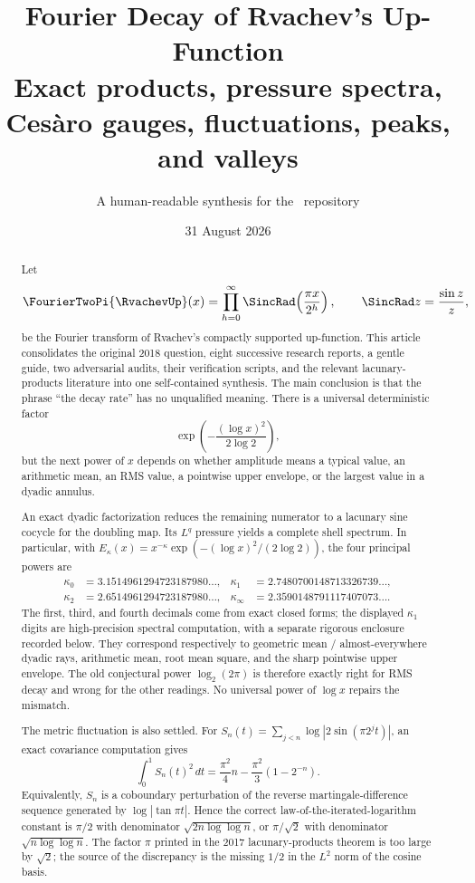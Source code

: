 \documentclass[11pt,oneside]{article}
\title{\bfseries Fourier Decay of Rvachev's Up-Function\\[0.35em]
\large Exact products, pressure spectra, Ces\`aro gauges, fluctuations, peaks, and valleys}
\author{A human-readable synthesis for the \repo\ repository}
\date{31 August 2026}
\numberwithin{equation}{section}
\theoremstyle{definition}
\theoremstyle{remark}
\begin{document}
\maketitle

\begin{abstract}
Let
\[
 \FourierTwoPi{\RvachevUp}(x)
 =\prod_{h=0}^{\infty}\SincRad\!\left(\frac{\pi x}{2^h}\right),
 \qquad \SincRad z=\frac{\sin z}{z},
\]
be the Fourier transform of Rvachev's compactly supported up-function.  This article
consolidates the original 2018 question, eight successive research reports, a gentle guide,
two adversarial audits, their verification scripts, and the relevant lacunary-products
literature into one self-contained synthesis.  The main conclusion is that the phrase ``the decay rate'' has no
unqualified meaning.  There is a universal deterministic factor
\[
 \exp\!\left(-\frac{(\log x)^2}{2\log2}\right),
\]
but the next power of $x$ depends on whether amplitude means a typical value, an arithmetic
mean, an RMS value, a pointwise upper envelope, or the largest value in a dyadic annulus.

An exact dyadic factorization reduces the remaining numerator to a lacunary sine cocycle for
the doubling map.  Its $L^q$ pressure yields a complete shell spectrum.  In particular, with
$E_\kappa(x)=x^{-\kappa}\exp(- (\log x)^2/(2\log2))$, the four principal powers are
\[
 \begin{aligned}
 \kappa_0&=3.1514961294723187980\ldots,&
 \kappa_1&=2.7480700148713326739\ldots,\\
 \kappa_2&=2.6514961294723187980\ldots,&
\kappa_\infty&=2.3590148791117407073\ldots .
 \end{aligned}
\]
The first, third, and fourth decimals come from exact closed forms; the displayed
$\kappa_1$ digits are high-precision spectral computation, with a separate rigorous
enclosure recorded below.
They correspond respectively to geometric mean / almost-everywhere dyadic rays, arithmetic
mean, root mean square, and the sharp pointwise upper envelope.  The old conjectural power
$\log_2(2\pi)$ is therefore exactly right for RMS decay and wrong for the other readings.
No universal power of $\log x$ repairs the mismatch.

The metric fluctuation is also settled.  For
$S_n(t)=\sum_{j<n}\log|2\sin(\pi2^jt)|$, an exact covariance computation gives
\[
 \int_0^1S_n(t)^2\,dt
 =\frac{\pi^2}{4}n-\frac{\pi^2}{3}(1-2^{-n}).
\]
Equivalently, $S_n$ is a coboundary perturbation of the reverse martingale-difference
sequence generated by $\log|\tan\pi t|$.  Hence the correct law-of-the-iterated-logarithm
constant is $\pi/2$ with denominator $\sqrt{2n\log\log n}$, or $\pi/\sqrt2$ with denominator
$\sqrt{n\log\log n}$.  The factor $\pi$ printed in the 2017 lacunary-products theorem is too
large by $\sqrt2$; the source of the discrepancy is the missing $1/2$ in the $L^2$ norm of
the cosine basis.


\end{abstract}
\end{document}
